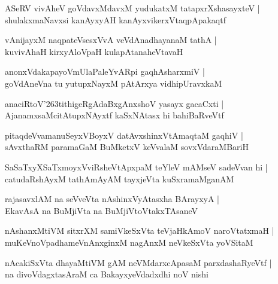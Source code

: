 \documentclass[twoside,12pt,openright]{book}
\def\S{\char'263}
\newcounter{shloka}[chapter]
\begin{document}
\begin{shloka}%
ASeRV vivAheV goVdavxMdavxM yudukatxM tatapxrXshasayxteV |\\
shulakxmaNavxsi kanAyxyAH kanAyxvikerxVtaqpApakaqtf 
\end{shloka}

\begin{shloka}%
vAnijayxM naqpateVsesxVvA veVdAnadhayanaM tathA |\\
kuvivAhaH kirxyAloVpaH kulapAtanaheVtavaH
\end{shloka}

\begin{shloka}%
anonxVdakapayoVmUlaPaleYvARpi gaqhAsharxmiV |\\
goVdAneVna tu yutupxNayxM pAtArxya vidhipUravxkaM 
\end{shloka}

\begin{shloka}%
anaciRtoV\S tithigeRgAdaBxgAnxshoV yasayx gacaCxti |\\
AjanamxsaMcitAtupxNAyxtf kaSxNAtasx hi bahiBaRveVtf 
\end{shloka}

\begin{shloka}%
pitaqdeVvamanuSeyxVBoyxV datAvxshinxVtAmaqtaM gaqhiV |\\
sAvxthaRM paramaGaM BuMketxV keVvalaM sovxVdaraMBariH
\end{shloka}

\begin{shloka}%
SaSaTxyXSaTxmoyxVviRsheVtApxpaM teYleV mAMseV sadeVvan hi |\\
catudaRshAyxM tathAmAyAM tayxjeVta kuSxramaMganAM 
\end{shloka}

\begin{shloka}%
rajasavxlAM na seVveVta nAshinxVyAtasxha BArayxyA |\\
EkavAsA na BuMjiVta na BuMjiVtoVtakxTAsaneV 
\end{shloka}

\begin{shloka}%
nAshanxMtiVM sitxrXM samiVkeSxVta teVjaHkAmoV naroVtatxmaH |\\
muKeVnoVpadhameVnAnxginxM  nagAnxM neVkeSxVta yoVSitaM 
\end{shloka}

\begin{shloka}%
nAcakiSxVta dhayaMtiVM gAM neVMdarxcApasaM parxdashaRyeVtf |\\
na divoVdagxtasAraM ca BakayxyeVdadxdhi noV nishi
\end{shloka}
\end{document}
